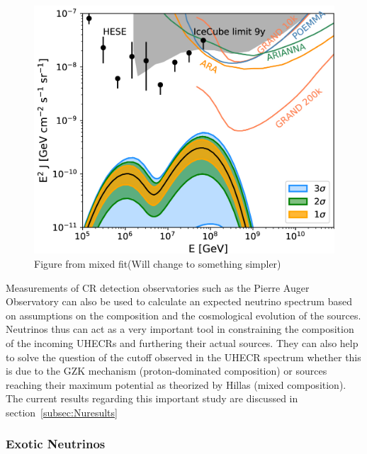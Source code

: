 \begin{figure}[t!]
  \centering
  \includegraphics[width=14.5cm]{thesis_figures/CRnNu/apjab05cef9_hr.jpg}
  \caption{Figure from mixed fit(Will change to something simpler)~\cite{Heinze:2019jou}}
  \label{fig:model_nu_auger_mixed}
\end{figure}

Measurements of \gls*{CR} detection observatories such as the Pierre Auger Observatory can also be used to calculate an expected neutrino spectrum based on assumptions on the composition and the cosmological evolution of the sources. Neutrinos thus can act as a very important tool in constraining the composition of the incoming \glspl*{UHECR} and furthering their actual sources. They can also help to solve the question of the cutoff observed in the \gls*{UHECR} spectrum whether this is due to the \gls*{GZK} mechanism (proton-dominated composition) or sources reaching their maximum potential as theorized by Hillas (mixed composition). The current results regarding this important study are discussed in section~\ref{subsec:Nuresults}


\subsubsection*{Exotic Neutrinos}
\label{subsubsec:ExoticNu}

